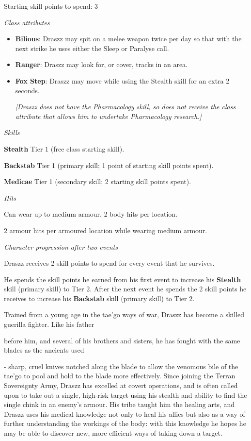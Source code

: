 \documentclass{scrbook}
\begin{document}
Starting skill points to spend: 3

\textit{Class attributes}

\begin{itemize}
\item \textbf{Bilious}: Draszz may spit on a melee weapon twice per day so that with the next strike he uses either the Sleep or Paralyse call.

\item \textbf{Ranger}: Draszz may look for, or cover, tracks in an area.

\item \textbf{Fox Step}: Draszz may move while using the Stealth skill for an extra 2 seconds.

\textit{{[}Draszz does not have the Pharmacology skill, so does not receive the class attribute that allows him to undertake Pharmacology research.{]}}

\end{itemize}
\textit{Skills}

\textbf{Stealth} Tier 1 (free class starting skill).

\textbf{Backstab} Tier 1 (primary skill; 1 point of starting skill points spent).

\textbf{Medicae} Tier 1 (secondary skill; 2 starting skill points spent).

\textit{Hits}

Can wear up to medium armour. 2 body hits per location.

2 armour hits per armoured location while wearing medium armour.

\textit{Character progression after two events}

Draszz receives 2 skill points to spend for every event that he survives.

He spends the skill points he earned from his first event to increase his \textbf{Stealth} skill (primary skill) to Tier 2. After the next event he spends the 2 skill points he receives to increase his \textbf{Backstab} skill (primary skill) to Tier 2.

Trained from a young age in the tae'go ways of war, Draszz has become a skilled guerilla fighter. Like his father

before him, and several of his brothers and sisters, he has fought with the same blades as the ancients used

- sharp, cruel knives notched along the blade to allow the venomous bile of the tae'go to pool and hold to the blade more effectively. Since joining the Terran Sovereignty Army, Draszz has excelled at covert operations, and is often called upon to take out a single, high-risk target using his stealth and ability to find the single chink in an enemy's armour. His tribe taught him the healing arts, and Draszz uses his medical knowledge not only to heal his allies but also as a way of further understanding the workings of the body: with this knowledge he hopes he may be able to discover new, more efficient ways of taking down a target.
\end{document}
